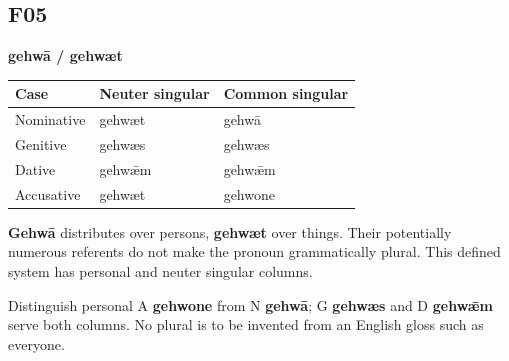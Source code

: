 \subsection*{F05}

\par\begin{minipage}{\linewidth}\raggedright
\textbf{gehwā /\allowbreak{} gehwæt}

\par\begingroup
\fontsize{10.5}{13.2}\selectfont
\setlength{\LTleft}{0pt}\setlength{\LTright}{\fill}
\noindent
\begin{tabular}{@{}>{\raggedright\arraybackslash}p{39.459mm}>{\raggedright\arraybackslash}p{39.459mm}>{\raggedright\arraybackslash}p{39.459mm}@{}}
\toprule
\textbf{Case} & \textbf{Neuter singular} & \textbf{Common singular} \\
\midrule
Nominative & gehwæt & gehwā \\
Genitive & gehwæs & gehwæs \\
Dative & gehwǣm & gehwǣm \\
Accusative & gehwæt & gehwone \\
\bottomrule
\end{tabular}
\par\endgroup
\textbf{Gehwā} distributes over persons, \textbf{gehwæt} over things. Their potentially numerous referents do not make the pronoun grammatically plural. This defined system has personal and neuter singular columns.

Distinguish personal A \textbf{gehwone} from N \textbf{gehwā}; G \textbf{gehwæs} and D \textbf{gehwǣm} serve both columns. No plural is to be invented from an English gloss such as everyone.

\end{minipage}\par\addvspace{4pt}

